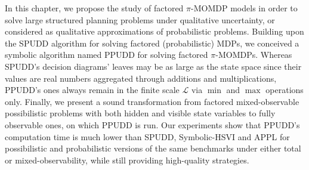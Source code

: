 

In this chapter, we propose 
the study of factored $\pi$-MOMDP models 
in order to solve large
structured planning problems 
under qualitative uncertainty, 
or considered
as qualitative approximations of probabilistic problems. 
Building upon the SPUDD
algorithm for solving factored (probabilistic) MDPs, 
we conceived a symbolic
algorithm named PPUDD for solving 
factored $\pi$-MOMDPs. Whereas SPUDD's
decision diagrams' leaves may be 
as large as the state space since their values
are real numbers aggregated through 
additions and multiplications, PPUDD's ones
always remain in the finite scale $\mathcal{L}$ 
via $\min$ and $\max$ operations only.
Finally,
we present a sound transformation from factored
mixed-observable possibilistic problems with both hidden and visible state
variables to fully observable ones, on which PPUDD is run.
Our experiments show that PPUDD's 
computation time is much lower than SPUDD,
Symbolic-HSVI and APPL for possibilistic 
and probabilistic versions of the same
benchmarks under either total 
or mixed-observability, while still providing
high-quality strategies. 


